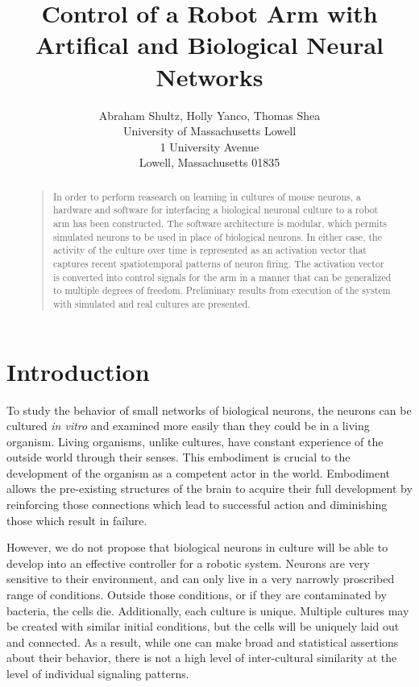 \documentclass[letterpaper]{article}
\begin{document}
%
\title{Control of a Robot Arm with Artifical and Biological Neural Networks}
\author{Abraham Shultz, Holly Yanco, Thomas Shea\\
University of Massachusetts Lowell\\
1 University Avenue\\
Lowell, Massachusetts 01835\\
}
\maketitle
\begin{abstract}
\begin{quote}
In order to perform reasearch on learning in cultures of mouse neurons, a hardware and software for interfacing a biological neuronal culture to a robot arm has been constructed. 
The software architecture is modular, which permits simulated neurons to be used in place of biological neurons. 
In either case, the activity of the culture over time is represented as an activation vector that captures recent spatiotemporal patterns of neuron firing. 
The activation vector is converted into control signals for the arm in a manner that can be generalized to multiple degrees of freedom. 
Preliminary results from execution of the system with simulated and real cultures are presented. 
\end{quote}
\end{abstract}

\section{Introduction}

To study the behavior of small networks of biological neurons, the neurons can be cultured \textit{in vitro} and examined more easily than they could be in a living organism. 
Living organisms, unlike cultures, have constant experience of the outside world through their senses. 
This embodiment is crucial to the development of the organism as a competent actor in the world.
Embodiment allows the pre-existing structures of the brain to acquire their full development by reinforcing those connections which lead to successful action and diminishing those which result in failure. 

However, we do not propose that biological neurons in culture will be able to develop into an effective controller for a robotic system.
Neurons are very sensitive to their environment, and can only live in a very narrowly proscribed range of conditions. 
Outside those conditions, or if they are contaminated by bacteria, the cells die. 
Additionally, each culture is unique. Multiple cultures may be created with similar initial conditions, but the cells will be uniquely laid out and connected. 
As a result, while one can make broad and statistical assertions about their behavior, there is not a high level of inter-cultural similarity at the level of individual signaling patterns. 
\end{document}

